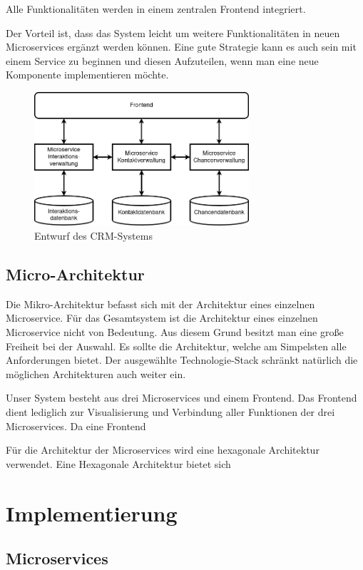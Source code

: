 Alle Funktionalitäten werden in einem zentralen Frontend integriert.

Der Vorteil ist, dass das System leicht um weitere Funktionalitäten in neuen Microservices ergänzt werden können. Eine gute Strategie kann es auch sein mit einem Service zu beginnen und diesen Aufzuteilen, wenn man eine neue Komponente implementieren möchte.

\begin{figure}[H] 
    \centering
    \includegraphics[width=0.71\textwidth]{figures/CRMEntwurf.png}
    \caption{Entwurf des \acp{CRM-System}}
\end{figure}

\subsection{Micro-Architektur}

Die Mikro-Architektur befasst sich mit der Architektur eines einzelnen Microservice. Für das Gesamtsystem ist die Architektur eines einzelnen Microservice nicht von Bedeutung. Aus diesem Grund besitzt man eine große Freiheit bei der Auswahl. Es sollte die Architektur, welche am Simpelsten alle Anforderungen bietet. Der ausgewählte Technologie-Stack schränkt natürlich die möglichen Architekturen auch weiter ein.

Unser System besteht aus drei Microservices und einem Frontend. Das Frontend dient lediglich zur Visualisierung und Verbindung aller Funktionen der drei Microservices. Da eine Frontend 

Für die Architektur der Microservices wird eine hexagonale Architektur verwendet. Eine Hexagonale Architektur bietet sich 


\section{Implementierung}


\subsection{Microservices}

